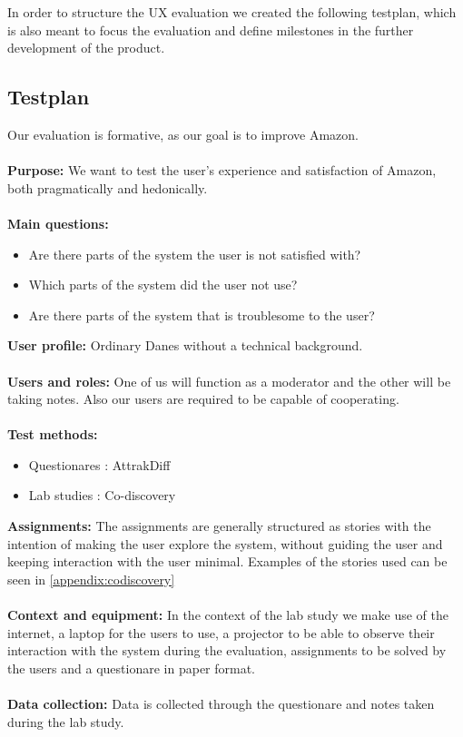 In order to structure the UX evaluation we created the following testplan, which is also meant to focus the evaluation and define milestones in the further development of the product.

\subsection{Testplan}
Our evaluation is formative, as our goal is to improve Amazon. \\ \\
\textbf{Purpose:} We want to test the user's experience and satisfaction of Amazon, both pragmatically and hedonically. \\ \\
\textbf{Main questions:}
\begin{itemize}
\item Are there parts of the system the user is not satisfied with?
\item Which parts of the system did the user not use?
\item Are there parts of the system that is troublesome to the user?
\end{itemize}
\textbf{User profile:}
Ordinary Danes without a technical background. \\ \\
\textbf{Users and roles:}
One of us will function as a moderator and the other will be taking notes. Also our users are required to be capable of cooperating. \\ \\
\textbf{Test methods:}
\begin{itemize}
\item Questionares : AttrakDiff
\item Lab studies : Co-discovery
\end{itemize}
\textbf{Assignments:} The assignments are generally structured as stories with the intention of making the user explore the system, without guiding the user and keeping interaction with the user minimal. Examples of the stories used can be seen in \autoref{appendix:codiscovery} \\ \\
\textbf{Context and equipment:} In the context of the lab study we make use of the internet, a laptop for the users to use, a projector to be able to observe their interaction with the system during the evaluation, assignments to be solved by the users and a questionare in paper format. \\ \\
\textbf{Data collection:} Data is collected through the questionare and notes taken during the lab study.

